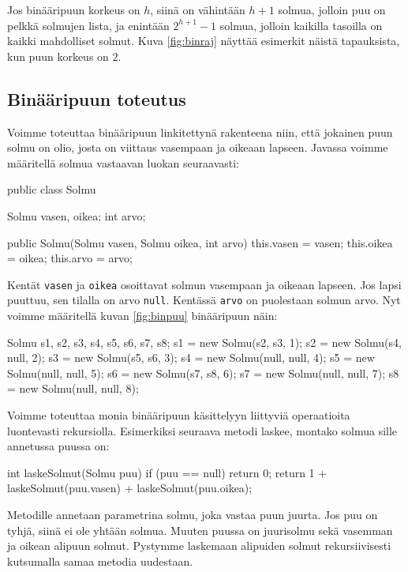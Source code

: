 Jos binääripuun korkeus on $h$, siinä on vähintään $h+1$ solmua,
jolloin puu on pelkkä solmujen lista,
ja enintään $2^{h+1}-1$ solmua,
jolloin kaikilla tasoilla on kaikki mahdolliset solmut.
Kuva \ref{fig:binraj} näyttää esimerkit näistä tapauksista,
kun puun korkeus on $2$.

\subsection{Binääripuun toteutus}

Voimme toteuttaa binääripuun linkitettynä rakenteena niin,
että jokainen puun solmu on olio, josta on viittaus
vasempaan ja oikeaan lapseen.
Javassa voimme määritellä solmua vastaavan luokan seuraavasti:

\begin{code}
public class Solmu {
    Solmu vasen, oikea;
    int arvo;

    public Solmu(Solmu vasen, Solmu oikea, int arvo) {
        this.vasen = vasen;
        this.oikea = oikea;
        this.arvo = arvo;
    }
}
\end{code}

Kentät \texttt{vasen} ja \texttt{oikea} osoittavat solmun
vasempaan ja oikeaan lapseen.
Jos lapsi puuttuu, sen tilalla on arvo \texttt{null}.
Kentässä \texttt{arvo} on puolestaan solmun arvo.
Nyt voimme määritellä kuvan \ref{fig:binpuu} binääripuun näin:

\begin{code}
Solmu s1, s2, s3, s4, s5, s6, s7, s8;
s1 = new Solmu(s2, s3, 1);
s2 = new Solmu(s4, null, 2);
s3 = new Solmu(s5, s6, 3);
s4 = new Solmu(null, null, 4);
s5 = new Solmu(null, null, 5);
s6 = new Solmu(s7, s8, 6);
s7 = new Solmu(null, null, 7);
s8 = new Solmu(null, null, 8);
\end{code}

Voimme toteuttaa monia binääripuun käsittelyyn liittyviä
operaatioita luontevasti rekursiolla.
Esimerkiksi seuraava metodi laskee, montako solmua
sille annetussa puussa on:

\begin{code}
int laskeSolmut(Solmu puu) {
    if (puu == null) return 0;
    return 1 + laskeSolmut(puu.vasen) + laskeSolmut(puu.oikea);
}
\end{code}

Metodille annetaan parametrina solmu,
joka vastaa puun juurta.
Jos puu on tyhjä, siinä ei ole yhtään solmua.
Muuten puussa on juurisolmu sekä vasemman
ja oikean alipuun solmut.
Pystymme laskemaan alipuiden solmut rekursiivisesti
kutsumalla samaa metodia uudestaan.


